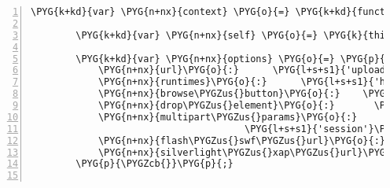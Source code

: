 \begin{Verbatim}[commandchars=\\\{\},numbers=left,firstnumber=1,stepnumber=5]
    \PYG{k+kd}{var} \PYG{n+nx}{context} \PYG{o}{=} \PYG{k+kd}{function}\PYG{p}{(}\PYG{n+nx}{name}\PYG{p}{)} \PYG{p}{\PYGZob{}}

        \PYG{k+kd}{var} \PYG{n+nx}{self} \PYG{o}{=} \PYG{k}{this}\PYG{p}{;}

        \PYG{k+kd}{var} \PYG{n+nx}{options} \PYG{o}{=} \PYG{p}{\PYGZob{}}
            \PYG{n+nx}{url}\PYG{o}{:}      \PYG{l+s+s1}{'upload'}\PYG{p}{,}
            \PYG{n+nx}{runtimes}\PYG{o}{:}      \PYG{l+s+s1}{'html5,gears,flash,silverlight,browserplus,html4'}\PYG{p}{,}
            \PYG{n+nx}{browse\PYGZus{}button}\PYG{o}{:}    \PYG{n+nx}{name} \PYG{o}{+} \PYG{l+s+s1}{'\PYGZus{}browse'}\PYG{p}{,}
            \PYG{n+nx}{drop\PYGZus{}element}\PYG{o}{:}       \PYG{n+nx}{name} \PYG{o}{+} \PYG{l+s+s1}{'\PYGZus{}progress'}\PYG{p}{,}
            \PYG{n+nx}{multipart\PYGZus{}params}\PYG{o}{:}     \PYG{p}{\PYGZob{}} \PYG{l+s+s1}{'type'}\PYG{o}{:} \PYG{n+nx}{name}\PYG{p}{,}
                                      \PYG{l+s+s1}{'session'}\PYG{o}{:} \PYG{n+nx}{upload\PYGZus{}session} \PYG{p}{\PYGZcb{}}\PYG{p}{,}
            \PYG{n+nx}{flash\PYGZus{}swf\PYGZus{}url}\PYG{o}{:}          \PYG{n+nx}{path\PYGZus{}js} \PYG{o}{+} \PYG{l+s+s1}{'/plupload.flash.swf'}\PYG{p}{,}
            \PYG{n+nx}{silverlight\PYGZus{}xap\PYGZus{}url}\PYG{o}{:}      \PYG{n+nx}{path\PYGZus{}js} \PYG{o}{+} \PYG{l+s+s1}{'/plupload.silverlight.xap'}\PYG{p}{,}
        \PYG{p}{\PYGZcb{}}\PYG{p}{;}


\end{Verbatim}
